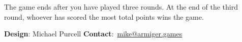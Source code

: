 \documentclass[a6paper, parskip=half, DIV=14, 10pt]{scrartcl}
\begin{document}
The game ends after you have played three rounds.
At the end of the third round, whoever has scored the most total points wins the game.

%
%
%


\vfill

\hrulefill

{\footnotesize \textbf{Design}: Michael Purcell \hfill \textbf{Contact}:~\href{mailto:mike@armiger.games}{mike@armiger.games}}

\newpage
\end{document}
